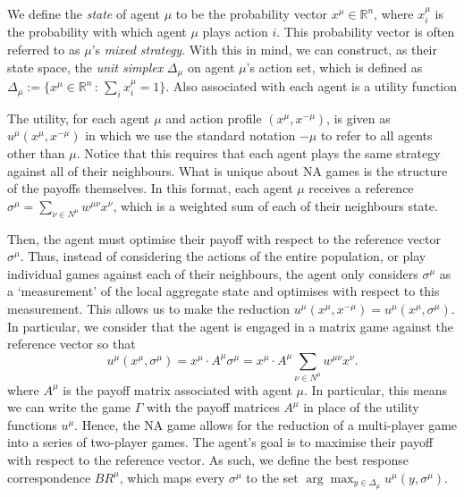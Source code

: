 \documentclass{article}
\theoremstyle{definition}
\newcommand{\utility}[1]{u^{#1}}
\newcommand{\wmunu}{w^{\mu \nu}}
\newcommand{\xmu}{x^{\mu}}
\newcommand{\xnu}{x^{\nu}}
\newcommand{\refmu}{\sigma^{\mu}}
\newcommand{\weightedsum}{ \sum_{\nu \in N^\mu} \wmunu \xnu}
\newcommand{\xnotmu}{x^{-\mu}}
\newcommand{\xmuaction}[1]{x^{\mu}_{#1}}
\begin{document}
  We define the \emph{state} of agent $\mu$ to be the probability
  vector $\xmu \in \mathbb{R}^n$, where $\xmu_i$ is the probability
  with which agent $\mu$ plays action $i$.
  This
  probability vector is often referred to as $\mu$'s \emph{mixed
    strategy}. With this in mind, we can construct, as their state
  space, the {\em unit simplex} $\Delta_\mu$ on agent $\mu$'s action set, which
  is defined
  as $\Delta_\mu := \{\xmu \in \mathbb{R}^n \, : \, \sum_i
  \xmuaction{i} = 1\}$. Also associated with each agent is a utility
  function

  The utility, for each agent $\mu$ and action profile
  $(\xmu, \xnotmu)$, is given as $u^\mu(\xmu, \xnotmu)$ in which we
  use the standard notation $-\mu$ to refer to all agents other than
  $\mu$. Notice that this requires that each agent plays the same
  strategy against all of their neighbours. What is unique about 
  NA games is the structure of the payoffs themselves. In this format,
  each agent $\mu$ receives a reference $\sigma^{\mu} = \sum_{\nu \in N^\mu} \wmunu \xnu$, which is a weighted sum
  of each of their neighbours state.

  Then, the agent must optimise their payoff with respect to the
  reference vector $\sigma^{\mu}$. Thus, instead of considering
  the actions of the entire population, or play individual games
  against each of their neighbours, the agent only considers
  $\sigma^\mu$ as a `measurement' of the local aggregate state and
  optimises with respect to this measurement.  This allows us to make
  the reduction $u^\mu(\xmu, \xnotmu) = u^\mu(\xmu, \refmu)$. In
  particular, we consider that the agent is engaged in a matrix game
  against the reference vector so that
  \begin{equation}
    u^\mu(\xmu, \refmu) = \xmu \cdot A^\mu \refmu = \xmu
                \cdot A^\mu \weightedsum.
  \end{equation}
%
  where $A^\mu$ is the payoff matrix associated with agent $\mu$. In particular,  this means we can write the game $\Gamma$ with the payoff
  matrices $A^\mu$ in place of the utility functions
  $\utility{\mu}$. Hence, the NA game allows for the reduction of a
  multi-player game into a series of two-player games. The agent's goal
  is to maximise their payoff with respect to the reference vector. As
  such, we define the best response correspondence $BR^\mu$, which maps
  every $\refmu$ to the set $\arg \max_{y \in \Delta_\mu} {u^\mu(y,
    \refmu)}$.
\end{document}

